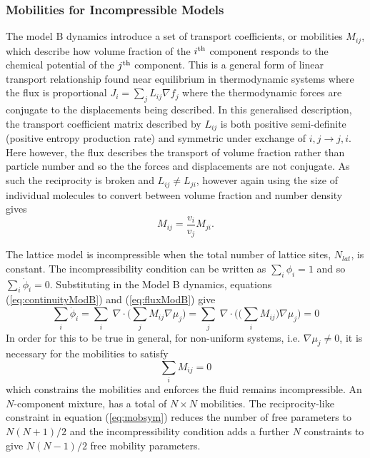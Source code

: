 \subsubsection{Mobilities for Incompressible Models}
The model B dynamics introduce a set of transport coefficients, or mobilities $M_{ij}$, which describe how volume fraction of the $i\textsuperscript{th}$ component responds to the chemical potential of the $j\textsuperscript{th}$ component. This is a general form of linear transport relationship found near equilibrium in thermodynamic systems where the flux is proportional $J_i = \sum_{j}L_{ij}\nabla f_{j}$ where the thermodynamic forces are conjugate to the displacements being described. In this generalised description, the transport coefficient matrix described by $L_{ij}$ is both positive semi-definite (positive entropy production rate) and symmetric under exchange of $i, j \rightarrow j, i$. Here however, the flux describes the transport of volume fraction rather than particle number and so the the forces and displacements are not conjugate. As such the reciprocity is broken and $L_{ij} \neq L_{ji}$, however again using the size of individual molecules to convert between volume fraction and number density gives
\begin{equation}
    {M}_{ij} = \frac{v_i}{v_j}{M}_{ji}.
    \label{eq:mobsym}
\end{equation}

The lattice model is incompressible when the total number of lattice sites, $N_{lat}$, is constant. The incompressibility condition can be written as $\sum_i\phi_i = 1$ and so $\sum_i\dot{\phi}_i = 0$. Substituting in the Model B dynamics, equations (\ref{eq:continuityModB}) and (\ref{eq:fluxModB}) give
\begin{equation}
    \sum_i\dot{\phi}_i = \sum_i\;\nabla\cdot\bigg(\sum_j M_{ij}\nabla\mu_j\bigg) = \sum_j\;\nabla\cdot\bigg(\big(\sum_i M_{ij}\big)\nabla\mu_j\bigg) = 0
\end{equation}
In order for this to be true in general, for non-uniform systems, i.e. $\nabla\mu_j \neq 0$, it is necessary for the mobilities to satisfy
\begin{equation}
    \sum_i M_{ij} = 0
    \label{eq:mobinc}
\end{equation}
which constrains the mobilities and enforces the fluid remains incompressible.\cite{kehr_mobility_1989} An $N$-component mixture,  has a total of $N\times N$ mobilities. The reciprocity-like constraint in equation (\ref{eq:mobsym}) reduces the number of free parameters to $N(N+1)/2$ and the incompressibility condition adds a further $N$ constraints to give $N(N-1)/2$ free mobility parameters.

